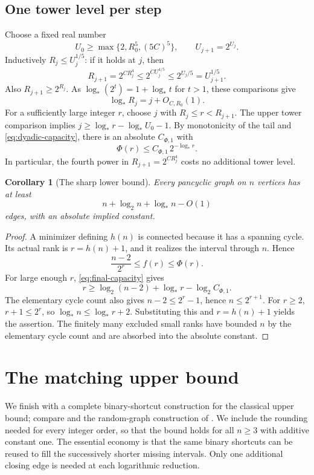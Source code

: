 \documentclass[11pt,a4paper]{article}
\numberwithin{equation}{section}
\newtheorem{corollary}[theorem]{Corollary}
\theoremstyle{definition}
\theoremstyle{remark}
\newcommand{\lstar}{\log_*}
\begin{document}
\subsection{One tower level per step}
Choose a fixed real number
\[
 U_0\ge\max\{2,R_0^5,(5C)^5\},\qquad U_{j+1}=2^{U_j}.
\]
Inductively $R_j\le U_j^{1/5}$: if it holds at $j$, then
\[
 R_{j+1}=2^{CR_j^4}\le2^{CU_j^{4/5}}
                       \le2^{U_j/5}=U_{j+1}^{1/5}.
\]
Also $R_{j+1}\ge2^{R_j}$. As $\lstar(2^t)=1+\lstar t$ for $t>1$, these comparisons give
\[
 \lstar R_j=j+O_{C,R_0}(1).
\]
For a sufficiently large integer $r$, choose $j$ with $R_j\le r<R_{j+1}$. The upper tower comparison implies $j\ge\lstar r-\lstar U_0-1$. By monotonicity of the tail and \eqref{eq:dyadic-capacity}, there is an absolute $C_{\Phi,1}$ with
\begin{equation}\label{eq:final-capacity}
 \Phi(r)\le C_{\Phi,1}\,2^{-\lstar r}.
\end{equation}
In particular, the fourth power in $R_{j+1}=2^{CR_j^4}$ costs no additional tower level.

\begin{corollary}[The sharp lower bound]\label{cor:lower}
Every pancyclic graph on $n$ vertices has at least
\[
 n+\log_2n+\lstar n-O(1)
\]
edges, with an absolute implied constant.
\end{corollary}
\begin{proof}
A minimizer defining $h(n)$ is connected because it has a spanning cycle. Its actual rank is $r=h(n)+1$, and it realizes the interval through $n$. Hence
\[
 \frac{n-2}{2^r}\le f(r)\le\Phi(r).
\]
For large enough $r$, \eqref{eq:final-capacity} gives
\[
 r\ge\log_2(n-2)+\lstar r-\log_2C_{\Phi,1}.
\]
The elementary cycle count also gives $n-2\le2^r-1$, hence $n\le2^{r+1}$. For $r\ge2$, $r+1\le2^r$, so $\lstar n\le\lstar r+2$. Substituting this and $r=h(n)+1$ yields the assertion. The finitely many excluded small ranks have bounded $n$ by the elementary cycle count and are absorbed into the absolute constant.
\end{proof}


\section{The matching upper bound}\label{sec:upper}
We finish with a complete binary-shortcut construction for the classical upper bound; compare \cite{GKW} and the random-graph construction of \cite{AK}. We include the rounding needed for every integer order, so that the bound holds for all $n\ge3$ with additive constant one. The essential economy is that the same binary shortcuts can be reused to fill the successively shorter missing intervals. Only one additional closing edge is needed at each logarithmic reduction.
\end{document}
